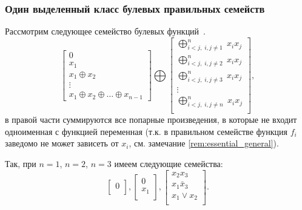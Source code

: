 \subsubsection{Один выделенный класс булевых правильных семейств}
\label{sec:quadfamily}

    Рассмотрим следующее семейство булевых функций~\cite{dm21}.
    \begin{equation}
    \label{example:family1}
        \begin{bmatrix}
            0 \\
            x_1 \\
            x_1 \oplus x_2 \\
            \vdots \\
            x_1 \oplus x_2 \oplus \ldots \oplus x_{n-1}
            \end{bmatrix}
            \bigoplus
            \begin{bmatrix}
            \bigoplus_{i < j, \; i, j \ne 1}^n \; x_i x_j \\
            \bigoplus_{i < j, \; i, j \ne 2}^n \; x_i x_j \\
            \bigoplus_{i < j, \; i, j \ne 3}^n \; x_i x_j \\
            \vdots \\
            \bigoplus_{i < j, \; i, j \ne n}^n \; x_i x_j \\
        \end{bmatrix},
    \end{equation}
    в правой части суммируются все попарные произведения, в которые не входит одноименная с функцией переменная (т.к. в правильном семействе функция $f_i$ заведомо не может зависеть от $x_i$, см. замечание \ref{rem:essential_general}).

    Так, при $n=1$, $n = 2$, $n = 3$ имеем следующие семейства:
    \[
        \begin{bmatrix}
            0 \\
        \end{bmatrix},
        \begin{bmatrix}
            0 \\
            x_1 \\
        \end{bmatrix},
        \begin{bmatrix}
            x_2 x_3 \\
            x_1 \bar{x}_3 \\
            x_1 \vee x_2 \\
        \end{bmatrix}.
    \]

